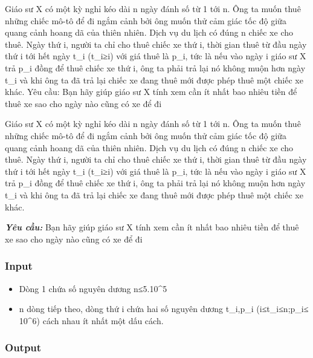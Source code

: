 



     Giáo sư X có một kỳ nghỉ kéo dài n ngày đánh số từ 1 tới n. Ông ta muốn thuê những chiếc mô-tô để đi ngắm cảnh bởi ông muốn thử cảm giác tốc độ giữa quang cảnh hoang dã của thiên nhiên. Dịch vụ du lịch có đúng n chiếc xe cho thuê. Ngày thứ i, người ta chỉ cho thuê chiếc xe thứ i, thời gian thuê từ đầu ngày thứ i tới hết ngày t\_i (t\_i≥i) với giá thuê là p\_i, tức là nếu vào ngày i giáo sư X trả p\_i đồng để thuê chiếc xe thứ i, ông ta phải trả lại nó không muộn hơn ngày t\_i và khi ông ta đã trả lại chiếc xe đang thuê mới được phép thuê một chiếc xe khác.       Yêu cầu: Bạn hãy giúp giáo sư X tính xem cần ít nhất bao nhiêu tiền để thuê xe sao cho ngày nào cũng có xe để đi    



   Giáo sư X có một kỳ nghỉ kéo dài n ngày đánh số từ 1 tới n. Ông ta muốn thuê những chiếc mô-tô để đi ngắm cảnh bởi ông muốn thử cảm giác tốc độ giữa quang cảnh hoang dã của thiên nhiên. Dịch vụ du lịch có đúng n chiếc xe cho thuê. Ngày thứ i, người ta chỉ cho thuê chiếc xe thứ i, thời gian thuê từ đầu ngày thứ i tới hết ngày t\_i (t\_i≥i) với giá thuê là p\_i, tức là nếu vào ngày i giáo sư X trả p\_i đồng để thuê chiếc xe thứ i, ông ta phải trả lại nó không muộn hơn ngày t\_i và khi ông ta đã trả lại chiếc xe đang thuê mới được phép thuê một chiếc xe khác.  

\textbf{\emph{     Yêu cầu:    }}   Bạn hãy giúp giáo sư X tính xem cần ít nhất bao nhiêu tiền để thuê xe sao cho ngày nào cũng có xe để đi  





\subsubsection{   Input  }


\begin{itemize}
	\item     Dòng 1 chứa số nguyên dương n≤5.10\textasciicircum5   
	\item     n dòng tiếp theo, dòng thứ i chứa hai số nguyên dương t\_i,p\_i (i≤t\_i≤n;p\_i≤ 10\textasciicircum6) cách nhau ít nhất một dấu cách.   
\end{itemize}



\subsubsection{   Output  }

